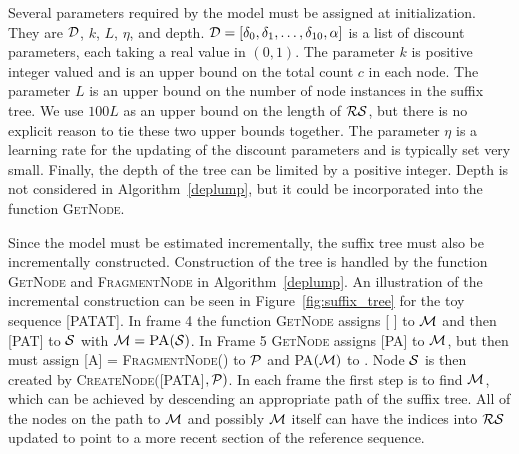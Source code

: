 
Several parameters required by the model must be assigned at initialization.  They are $\D$, $k$, $L$, $\eta$,  and depth.  $\D = [\dd_0, \dd_1, \ldots, \dd_{10}, \alpha]$ is a list of discount parameters, each taking a real value in $(0,1)$.  The parameter $k$ is positive integer valued and is an upper bound on the total count $c$ in each node.  The parameter $L$ is an upper bound on the number of node instances in the suffix tree.  We use $100L$ as an upper bound on the length of $\RS$, but there is no explicit reason to tie these two upper bounds together. The parameter $\eta$ is a learning rate for the updating of the discount parameters and is typically set very small.  Finally, the depth of the tree can be limited by a positive integer.  Depth is not considered in Algorithm~\ref{deplump}, but it could be incorporated into the function \textsc{GetNode}.

Since the model must be estimated incrementally, the suffix tree must also be incrementally constructed.  Construction of the tree is handled by the function \textsc{GetNode} and \textsc{FragmentNode} in Algorithm~\ref{deplump}.  An illustration of the incremental construction can be seen in Figure~\ref{fig:suffix_tree} for the toy sequence [PATAT].   In frame 4 the function \textsc{GetNode} assigns [ ]  to $\M$ and then [PAT] to $\Seq$ with $\M = \textsc{PA}(\Seq)$. In Frame 5 \textsc{GetNode} assigns [PA] to $\M$, but then must assign [A] = \textsc{FragmentNode}(\M) to $\PP$ and \textsc{PA}$(\M)$ to \PP.  Node $\Seq$ is then created by \textsc{CreateNode}$($[PATA]$,\PP)$.  In each frame the first step is to find $\M$, which can be achieved by descending an appropriate path of the suffix tree.  All of the nodes on the path to $\M$ and possibly $\M$ itself can have the indices into $\RS$ updated to point to a more recent section of the reference sequence. 

